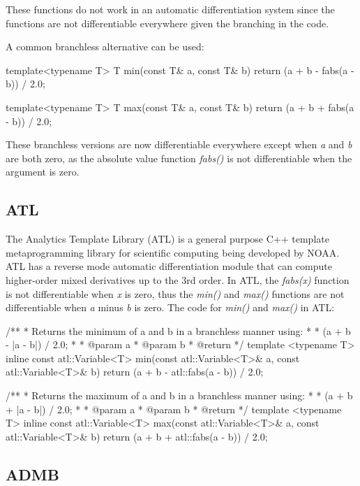 \documentclass[oneside]{article}
\begin{document}
These functions do not work in an automatic differentiation system since the functions are not differentiable everywhere given the branching in the code.

A common branchless alternative can be used:

\begin{cppsource}
template<typename T>
T min(const T& a, const T& b){
   return (a + b - fabs(a - b)) / 2.0;
}

template<typename T>
T max(const T& a, const T& b){
   return (a + b + fabs(a - b)) / 2.0;
}
\end{cppsource}

These branchless versions are now differentiable everywhere except when \textit{a} and \textit{b} are both zero, as the absolute value function \textit{fabs()} is not differentiable when the argument is zero.

\subsection{ATL}

The Analytics Template Library (ATL) is a general purpose C++ template metaprogramming library for scientific computing being developed by NOAA. ATL has a reverse mode automatic differentiation module that can compute higher-order mixed derivatives up to the 3rd order. In ATL, the \textit{fabs(x)} function is not differentiable when \textit{x} is zero, thus the \textit{min()} and \textit{max()} functions are not differentiable when \textit{a} minus \textit{b} is zero. The code for \textit{min()} and \textit{max()} in ATL:

\begin{cppsource}

/**
 * Returns the minimum of a and b in a branchless manner using:
 *
 * (a + b - |a - b|) / 2.0;
 *
 * @param a
 * @param b
 * @return
 */
template <typename T>
inline const atl::Variable<T> min(const atl::Variable<T>& a,
	const atl::Variable<T>& b) {
    return (a + b - atl::fabs(a - b)) / 2.0;
}

/**
 * Returns the maximum of a and b in a branchless manner using:
 *
 * (a + b + |a - b|) / 2.0;
 *
 * @param a
 * @param b
 * @return
 */
template <typename T>
inline const atl::Variable<T> max(const atl::Variable<T>& a,
	const atl::Variable<T>& b) {
    return (a + b + atl::fabs(a - b)) / 2.0;
}


\end{cppsource}


\subsection{ADMB}
\end{document}
